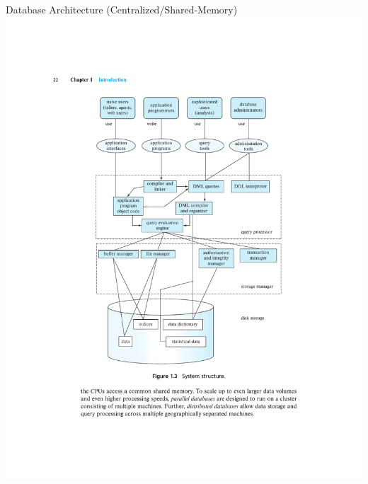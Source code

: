 \documentclass{beamer}
\begin{document}
\begin{frame}{Database Architecture (Centralized/Shared-Memory)}
    \centering 
    \includegraphics[width=0.625\textheight, trim={5.25cm 6.75cm 4.9cm 4.8cm}, clip]{figures/arch2}
\end{frame}
\end{document}
